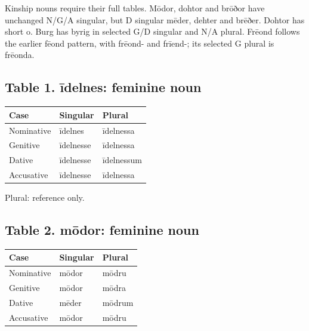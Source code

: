 Kinship nouns require their full tables. Mōdor, dohtor and brōðor have unchanged N/\allowbreak{}G/\allowbreak{}A singular, but D singular mēder, dehter and brēðer. Dohtor has short o. Burg has byrig in selected G/\allowbreak{}D singular and N/\allowbreak{}A plural. Frēond follows the earlier fēond pattern, with frēond- and frīend-; its selected G plural is frēonda.

\subsection*{Table 1. īdelnes: feminine noun}

\par\begingroup
\fontsize{10.5}{13.2}\selectfont
\setlength{\LTleft}{0pt}\setlength{\LTright}{\fill}
\noindent
\begin{tabular}{@{}>{\raggedright\arraybackslash}p{39.46mm}>{\raggedright\arraybackslash}p{39.46mm}>{\raggedright\arraybackslash}p{39.46mm}@{}}
\toprule
\textbf{Case} & \textbf{Singular} & \textbf{Plural} \\
\midrule
Nominative & īdelnes & īdelnessa \\
Genitive & īdelnesse & īdelnessa \\
Dative & īdelnesse & īdelnessum \\
Accusative & īdelnesse & īdelnessa \\
\bottomrule
\end{tabular}
\par\endgroup

Plural: reference only.

\subsection*{Table 2. mōdor: feminine noun}

\par\begingroup
\fontsize{10.5}{13.2}\selectfont
\setlength{\LTleft}{0pt}\setlength{\LTright}{\fill}
\noindent
\begin{tabular}{@{}>{\raggedright\arraybackslash}p{39.46mm}>{\raggedright\arraybackslash}p{39.46mm}>{\raggedright\arraybackslash}p{39.46mm}@{}}
\toprule
\textbf{Case} & \textbf{Singular} & \textbf{Plural} \\
\midrule
Nominative & mōdor & mōdru \\
Genitive & mōdor & mōdra \\
Dative & mēder & mōdrum \\
Accusative & mōdor & mōdru \\
\bottomrule
\end{tabular}
\par\endgroup

